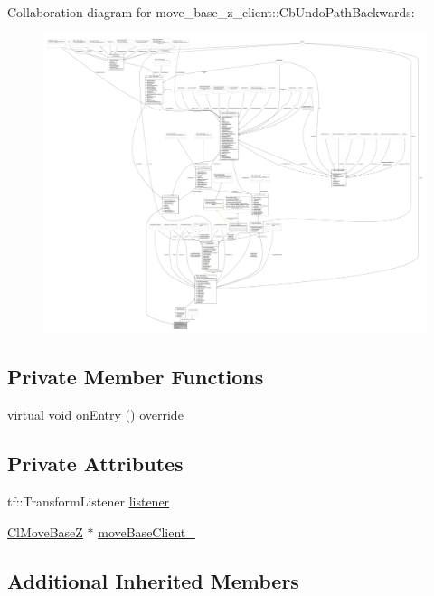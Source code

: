 Collaboration diagram for move\+\_\+base\+\_\+z\+\_\+client\+:\+:Cb\+Undo\+Path\+Backwards\+:
\nopagebreak
\begin{figure}[H]
\begin{center}
\leavevmode
\includegraphics[width=350pt]{classmove__base__z__client_1_1CbUndoPathBackwards__coll__graph}
\end{center}
\end{figure}
\subsection*{Private Member Functions}
\begin{DoxyCompactItemize}
\item 
virtual void \hyperlink{classmove__base__z__client_1_1CbUndoPathBackwards_a2793c69857aa97337d56ff79dee20508}{on\+Entry} () override
\end{DoxyCompactItemize}
\subsection*{Private Attributes}
\begin{DoxyCompactItemize}
\item 
tf\+::\+Transform\+Listener \hyperlink{classmove__base__z__client_1_1CbUndoPathBackwards_a197e2034e873c09de896e7a8b6fe898f}{listener}
\item 
\hyperlink{classmove__base__z__client_1_1ClMoveBaseZ}{Cl\+Move\+BaseZ} $\ast$ \hyperlink{classmove__base__z__client_1_1CbUndoPathBackwards_a19e7ace85698725a1d2730a7c6b3aa7d}{move\+Base\+Client\+\_\+}
\end{DoxyCompactItemize}
\subsection*{Additional Inherited Members}


